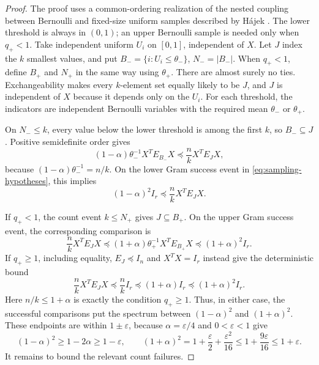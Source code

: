 \documentclass[11pt]{article}
\theoremstyle{definition}
\theoremstyle{remark}
\theoremstyle{plain}
\begin{document}
\begin{proof}
The proof uses a common-ordering realization of the nested coupling between
Bernoulli and fixed-size uniform samples described by H\'ajek
\cite[Section~2, pp.~362--363]{hajek_sampling}.
The lower threshold is always in $(0,1)$; an upper Bernoulli sample
is needed only when $q_+<1$.
Take independent uniform \(U_i\) on \([0,1]\), independent of \(X\).
Let \(J\) index the \(k\) smallest values, and put
\(B_-=\{i:U_i\le\theta_-\}\), \(N_-=|B_-|\).
When $q_+<1$, define $B_+$ and $N_+$ in the same way using $\theta_+$.
There are almost surely no ties. Exchangeability makes every
$k$-element set equally likely to be $J$, and $J$ is independent
of $X$ because it depends only on the $U_i$. For each threshold,
the indicators are independent Bernoulli variables with the required
mean $\theta_-$ or $\theta_+$.

On $N_-\le k$, every value below the lower threshold is among
the first $k$, so $B_-\subseteq J$. Positive semidefinite order gives
\[
 (1-\alpha)\theta_-^{-1}X^TE_{B_-}X
       \preceq \frac nkX^TE_JX,
\]
because $(1-\alpha)\theta_-^{-1}=n/k$. On the lower Gram success
event in \eqref{eq:sampling-hypotheses}, this implies
\[
 (1-\alpha)^2I_r\preceq\frac nkX^TE_JX.
\]

If $q_+<1$, the count event $k\le N_+$ gives $J\subseteq B_+$.
On the upper Gram success event, the corresponding comparison is
\[
 \frac nkX^TE_JX
 \preceq (1+\alpha)\theta_+^{-1}X^TE_{B_+}X
 \preceq (1+\alpha)^2I_r.
\]
If $q_+\ge1$, including equality, $E_J\preceq I_n$ and $X^TX=I_r$
instead give the deterministic bound
\begin{equation}\label{eq:saturated-upper-bound}
 \frac nkX^TE_JX\preceq\frac nkI_r
       \preceq(1+\alpha)I_r\preceq(1+\alpha)^2I_r.
\end{equation}
Here $n/k\le1+\alpha$ is exactly the condition $q_+\ge1$.
Thus, in either case, the successful comparisons put the spectrum
between \((1-\alpha)^2\) and \((1+\alpha)^2\). These endpoints are within
$1\pm\varepsilon$, because $\alpha=\varepsilon/4$ and
$0<\varepsilon<1$ give
\[
 (1-\alpha)^2\ge1-2\alpha\ge1-\varepsilon,
 \qquad
 (1+\alpha)^2=1+\frac\varepsilon2+\frac{\varepsilon^2}{16}
                   \le1+\frac{9\varepsilon}{16}\le1+\varepsilon.
\]
It remains to bound the relevant count failures.


\end{proof}
\end{document}
